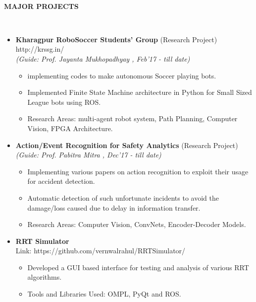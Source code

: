 \documentclass[a4paper,8pt]{article}
\newcommand{\isep}{-2 pt}
\newcommand{\lsep}{-0.5cm}
\newcommand{\resheading}[1]{{\small \colorbox{mygrey}{\begin{minipage}{0.975\textwidth}{\textbf{#1 \vphantom{p\^{E}}}}\end{minipage}}}}
\begin{document}
\hspace{0.5cm}\\[-0.2cm]
\resheading{\textbf{MAJOR PROJECTS} }\\[\lsep]

\begin{itemize}
\item \textbf{Kharagpur  RoboSoccer  Students'  Group} (Research Project) \hspace{0.5cm}
{http://krssg.in/}\\
 \emph{(Guide: Prof. Jayanta Mukhopadhyay
, Feb'17 - till date)} \\[-0.6cm]
	\begin{itemize}\itemsep \isep
	\item  implementing codes to make autonomous Soccer playing bots.
	\item Implemented Finite State Machine architecture in Python for Small Sized League bots using ROS.

	\item Research Areas: multi-agent robot system, Path Planning, Computer Vision, FPGA Architecture.
	\end{itemize}

\item \textbf{Action/Event Recognition for Safety Analytics} (Research Project) \hspace{0.5cm} \\
 \emph{(Guide: Prof. Pabitra Mitra
, Dec'17 - till date)} \\[-0.6cm]
	\begin{itemize}\itemsep \isep
	\item Implementing various papers on action recognition to exploit their usage for accident detection.
	\item Automatic detection of such unfortunate incidents to avoid the damage/loss caused due to delay in information transfer.
	\item Research Areas: Computer Vision, ConvNets, Encoder-Decoder Models.
	\end{itemize}		 

\item \textbf{RRT Simulator} \\
Link: {https://github.com/vernwalrahul/RRTSimulator/}
\begin{itemize} \itemsep \isep
\item Developed a GUI based interface for testing and analysis of various RRT algorithms.	
\item Tools and Libraries Used: OMPL, PyQt and ROS.
\end{itemize}


\end{itemize}
\end{document}
